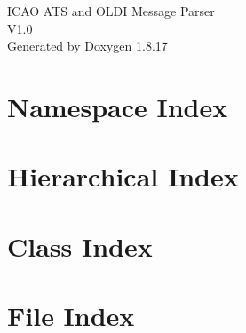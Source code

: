 \let\mypdfximage\pdfximage\def\pdfximage{\immediate\mypdfximage}\documentclass[twoside]{book}
\newcommand{\+}{\discretionary{\mbox{\scriptsize$\hookleftarrow$}}{}{}}
\newcommand{\clearemptydoublepage}{%
  \newpage{\pagestyle{empty}\cleardoublepage}%
}
\begin{document}
\hypersetup{pageanchor=false,
             bookmarksnumbered=true,
             pdfencoding=unicode
            }
\begin{titlepage}
\vspace*{7cm}
\begin{center}%
{\Large I\+C\+AO A\+TS and O\+L\+DI Message Parser \\[1ex]\large V1.\+0 }\\
\vspace*{1cm}
{\large Generated by Doxygen 1.8.17}\\
\end{center}
\end{titlepage}
\clearemptydoublepage
{}
\tableofcontents
\clearemptydoublepage
{}
\hypersetup{pageanchor=true}

\chapter{Namespace Index}

\chapter{Hierarchical Index}

\chapter{Class Index}

\chapter{File Index}

\end{document}
